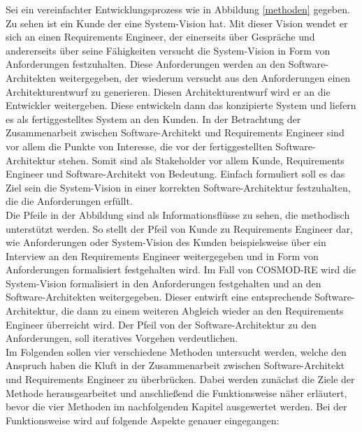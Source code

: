 Sei ein vereinfachter Entwicklungsprozess wie in Abbildung \ref{methoden} gegeben. Zu sehen ist ein Kunde der eine System-Vision hat. Mit dieser Vision wendet er sich an einen Requirements Engineer, der einerseits \"uber Gespr\"ache und andererseits \"uber seine F\"ahigkeiten versucht die System-Vision in Form von Anforderungen festzuhalten. Diese Anforderungen werden an den Software-Architekten weitergegeben, der wiederum versucht aus den Anforderungen einen Architekturentwurf zu generieren. Diesen Architekturentwurf wird er an die Entwickler weitergeben. Diese entwickeln dann das konzipierte System und liefern es als fertiggestelltes System an den Kunden. In der Betrachtung der Zusammenarbeit zwischen Software-Architekt und Requirements Engineer sind vor allem die Punkte von Interesse, die vor der fertiggestellten Software-Architektur stehen. Somit sind als Stakeholder vor allem Kunde, Requirements Engineer und Software-Architekt von Bedeutung. Einfach formuliert soll es das Ziel sein die System-Vision in einer korrekten Software-Architektur festzuhalten, die die Anforderungen erf\"ullt.\\

Die Pfeile in der Abbildung sind als Informationsfl\"usse zu sehen, die methodisch unterst\"utzt werden. So stellt der Pfeil von Kunde zu Requirements Engineer dar, wie Anforderungen oder System-Vision des Kunden beispielsweise \"uber ein Interview an den Requirements Engineer weitergegeben und in Form von Anforderungen formalisiert festgehalten wird. Im Fall von COSMOD-RE wird die System-Vision formalisiert in den Anforderungen festgehalten und an den Software-Architekten weitergegeben. Dieser entwirft eine entsprechende Software-Architektur, die dann zu einem weiteren Abgleich wieder an den Requirements Engineer \"uberreicht wird. Der Pfeil von der Software-Architektur zu den Anforderungen, soll iteratives Vorgehen verdeutlichen.\\

Im Folgenden sollen vier verschiedene Methoden untersucht werden, welche den Anspruch haben die Kluft in der Zusammenarbeit zwischen Software-Architekt und Requirements Engineer zu \"uberbr\"ucken. Dabei werden zun\"achst die Ziele der Methode herausgearbeitet und anschlie\ss{}end die Funktionsweise n\"aher erl\"autert, bevor die vier Methoden im nachfolgenden Kapitel ausgewertet werden. Bei der Funktionsweise wird auf folgende Aspekte genauer eingegangen: \\

